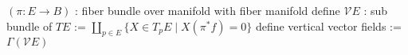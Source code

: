 \begin{Definition}
\itemwhen \((\pi : E \to B)\) : fiber bundle over manifold with fiber manifold
\itemdefi
  define \(\mathcal{V}E\) : sub bundle of \(TE\) := \(\coprod_{p \in E} \{X \in T_p E \mid X(\pi^* f) = 0\}\)
  define vertical vector fields := \(\Gamma(\mathcal{V}E)\)
\end{Definition}